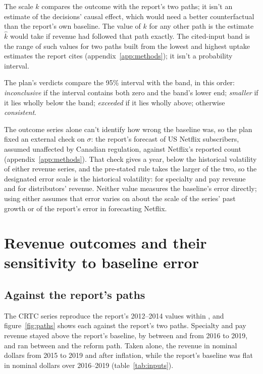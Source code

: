 The scale \(k\) compares the outcome with the report's two paths; it isn't an estimate of the decisions' causal effect, which would need a better counterfactual than the report's own baseline. The value of \(k\) for any other path is the estimate \(\hat k\) would take if revenue had followed that path exactly. The cited-input band is the range of such values for two paths built from the lowest and highest uptake estimates the report cites (appendix~\ref{app:methods}); it isn't a probability interval.

The plan's verdicts compare the 95\% interval with the band, in this order: \emph{inconclusive} if the interval contains both zero and the band's lower end; \emph{smaller} if it lies wholly below the band; \emph{exceeded} if it lies wholly above; otherwise \emph{consistent}.

The outcome series alone can't identify how wrong the baseline was, so the plan fixed an external check on \(\sigma\): the report's forecast of US Netflix subscribers, assumed unaffected by Canadian regulation, against Netflix's reported count (appendix~\ref{app:methods}). That check gives \lttvSigmaTech{} a year, below the historical volatility of either revenue series, and the pre-stated rule takes the larger of the two, so the designated error scale is the historical volatility: \lttvSigmaReadSpec{} for specialty and pay revenue and \lttvSigmaReadBDU{} for distributors' revenue. Neither value measures the baseline's error directly; using either assumes that error varies on about the scale of the series' past growth or of the report's error in forecasting Netflix.

\section{Revenue outcomes and their sensitivity to baseline error}
\label{sec:lttv-results}

\subsection{Against the report's paths}

The CRTC series reproduce the report's 2012--2014 values within \lttvSpliceTol{} \citep{crtc2017sfs2016, crtc2021sfs2020}, and figure~\ref{fig:paths} shows each against the report's two paths. Specialty and pay revenue stayed above the report's baseline, by between \lttvSpecVsBaselineMin{} and \lttvSpecVsBaselineMax{} from 2016 to 2019, and ran between \lttvSpecVsLTTVMin{} and \lttvSpecVsLTTVMax{} \lttvSpecAboveLTTV{} the reform path. Taken alone, the revenue \lttvSpecRevNomDir{} \lttvSpecRevNomChange{} in nominal dollars from 2015 to 2019 and \lttvSpecRevRealChange{} after inflation, while the report's baseline was flat in nominal dollars over 2016--2019 (table~\ref{tab:inputs}).

